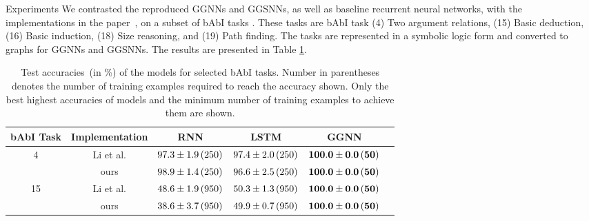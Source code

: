\documentclass[final,hyperref={pdfpagelabels=false}]{beamer}
\newcommand{\shrink}{-15pt}
\begin{document}
\begin{frame}[t]
\begin{columns}[t]
  \begin{column}{.02\textwidth}\end{column} %
    
  \begin{column}{.3\textwidth} %
  
  \vspace{\shrink}
    \begin{block}{Experiments}
      We contrasted the reproduced GGNNs and GGSNNs, as well as baseline recurrent neural networks, with the implementations in the paper~\cite{DBLP:journals/corr/LiTBZ15}, on a subset of bAbI tasks \cite{DBLP:journals/corr/WestonBCM15}. These tasks are bAbI task (4) Two argument relations, (15) Basic deduction, (16) Basic induction, (18) Size reasoning, and (19) Path finding. The tasks are represented in a symbolic logic form and converted to graphs for GGNNs and GGSNNs. The results are presented in Table \ref{table:table-1}.\vspace{0.1in}
      
      \begin{table}[t]
          \caption{Test accuracies~(in \%) of the models for selected bAbI tasks. Number in parentheses denotes the number of training examples required to reach the accuracy shown. Only the best highest accuracies of models and the minimum number of training examples to achieve them are shown.}\label{table:table-1}
          \vspace{0.1in}
          \centering
          \small
          \begin{tabular}{cccccc}
              \toprule
              bAbI Task & Implementation & RNN & LSTM & GGNN \\  \midrule
              \multirow{2}{*}{4} & Li et al. & $97.3 \pm 1.9\thinspace (250)$ & $97.4 \pm 2.0\thinspace  (250)$ & $\mathbf{100.0 \pm 0.0\thinspace (50)}$ \\
              & ours & $98.9 \pm 1.4\thinspace (250)$ & $96.6 \pm 2.5\thinspace (250)$ & $\mathbf{100.0 \pm 0.0\thinspace (50)}$ \\  \midrule
        
              \multirow{2}{*}{15} & Li et al. &  $48.6 \pm 1.9\thinspace (950)$ & $50.3 \pm 1.3\thinspace (950)$ & $\mathbf{100.0 \pm 0.0\thinspace (50)}$  \\
              & ours & $38.6 \pm 3.7\thinspace (950)$ & $49.9 \pm 0.7\thinspace (950)$ & $\mathbf{100.0 \pm 0.0\thinspace (50)}$ \\  \midrule
        

\end{tabular}
\end{table}
\end{block}
\end{column}
\end{columns}
\end{frame}
\end{document}
